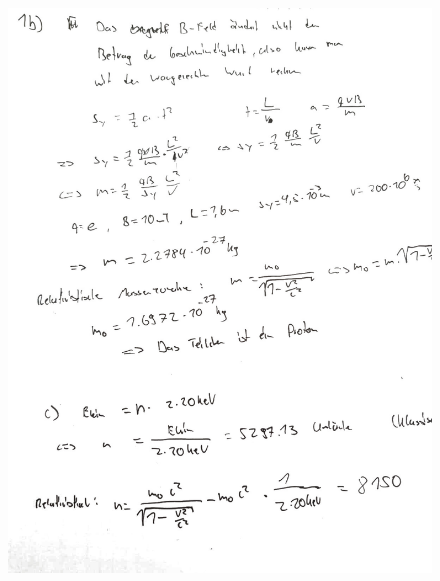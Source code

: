 \documentclass[11pt a4paper]{article}
\begin{document}
\begin{figure}[H]
	\centering
	\includegraphics[width=15cm]{1bc.jpg}
\end{figure}

\newpage
\setlength{\headheight}{0cm}
\end{document}
